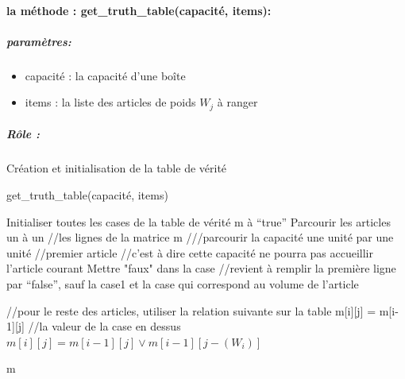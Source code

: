 \documentclass[12pt]{article}
\begin{document}
\paragraph{la méthode : get\_truth\_table(capacité, items):}
\subparagraph{paramètres:}
\begin{itemize}
    \item capacité : la capacité d’une boîte
    \item items : la liste des articles de poids $W_j$ à ranger
\end{itemize}
\subparagraph{Rôle :}
Création et initialisation de la table de vérité
\begin{algorithm}[H]
    \caption{get\_truth\_table(capacité, items)}
    \begin{algorithmic} 
    \STATE Initialiser toutes les cases de la table de vérité m à “true” 
    \STATE Parcourir les articles un à un //les lignes de la matrice m
            \STATE ///parcourir la capacité une unité par une unité
                \STATE //premier article
                    \STATE //c’est à dire cette capacité ne pourra pas accueillir l’article courant
                    \STATE Mettre "faux" dans la case
                    \STATE //revient à remplir la première ligne par “false”, sauf la case1 et la case qui correspond au volume de l’article
                
                
                    
                    
                \ENDIF
                
          \ELSE

                \STATE //pour le reste des articles, utiliser la relation suivante sur la table
                    \STATE m[i][j] = m[i-1][j] //la valeur de la case en dessus
                \ELSE
                    \STATE  $m[i][j] = m[i-1][j] \vee m[i-1][j-(W_i)]$


                \ENDIF
          \ENDIF
        \ENDFOR
    \ENDFOR
    \RETURN m
    \end{algorithmic} 
 \end{algorithm}
\end{document}
